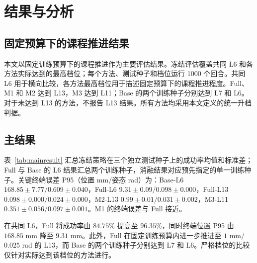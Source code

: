 \documentclass[conference]{IEEEtran}
\begin{document}
\section{结果与分析}
\subsection{固定预算下的课程推进结果}
本文以固定训练预算下的课程推进作为主要评估结果。冻结评估覆盖共同 L6 和各方法实际达到的最高档位；每个方法、测试种子和档位运行 1000 个回合。共同 L6 用于横向比较，各方法最高档位用于描述固定预算下的课程推进程度。Full、M1 和 M2 达到 L13，M3 达到 L11；Base 的两个训练种子分别达到 L7 和 L6。对于未达到 L13 的方法，不报告 L13 结果。所有方法均采用本文定义的统一升档判据。

\subsection{主结果}
表~\ref{tab:mainresult} 汇总冻结策略在三个独立测试种子上的成功率均值和标准差；Full 与 Base 的 L6 结果汇总两个训练种子，消融结果对应预先指定的单一训练种子。关键终端误差 P95（位置 mm/姿态 rad）为：Base-L6 $168.85\pm7.77/0.609\pm0.040$，Full-L6 $9.31\pm0.09/0.098\pm0.000$，Full-L13 $0.098\pm0.000/0.024\pm0.000$，M2-L13 $0.99\pm0.01/0.031\pm0.002$，M3-L11 $0.351\pm0.056/0.097\pm0.001$。M1 的终端误差与 Full 接近。

\begin{table}[t]
\caption{不同精度档位的冻结确定性成功率（均值 $\pm$ 标准差，\%）}
\label{tab:mainresult}
\centering
\small
{}
\end{table}

在共同 L6，Full 将成功率由 $84.75\%$ 提高至 $96.35\%$，同时终端位置 P95 由 $168.85$ mm 降至 $9.31$ mm。此外，Full 在固定训练预算内进一步推进至 $1$ mm/$0.025$ rad 的 L13，而 Base 的两个训练种子分别达到 L7 和 L6。严格档位的比较仅针对实际达到该档位的方法进行。
\end{document}
